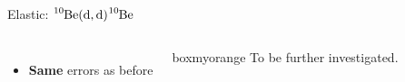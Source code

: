 \documentclass[sans,
frameno, %
mp,
usenames,dvipsnames, %
onlytextwidth, %
t,%
11pt]{beamer}
\newcommand{\notice}[1]{\textbf{\alert{#1}}}
\newcommand{\iso}[2]{\ce{^{#1}#2}}
\begin{document}
\begin{frame}{Elastic: $\iso{10}{Be}(\textrm{d}, \textrm{d})\iso{10}{Be}$}
{\begin{figure}
\begin{minipage}[t]{0.48\linewidth}
            \end{minipage}
        \end{figure}
        \begin{columns}
            {
                \begin{itemize}
                    \item \notice{Same} errors as before
                \end{itemize}
            }\hfill
            {

                \begin{beamercolorbox}[sep=1ex, center, rounded=true]{boxmyorange}
                    To be further investigated. \\
                \end{beamercolorbox}

            }
        \end{columns}
    }
\end{frame}
\end{document}
